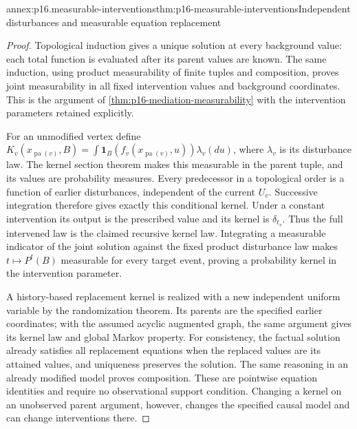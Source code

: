 \begin{annexitem}{annex:p16.measurable-interventions}{thm:p16-measurable-interventions}{Independent disturbances and measurable equation replacement}
\begin{proof}
Topological induction gives a unique solution at every background
value: each total function is evaluated after its parent values are
known. The same induction, using product measurability of finite
tuples and composition, proves joint measurability in all fixed
intervention values and background coordinates. This is the argument
of \cref{thm:p16-mediation-measurability} with the intervention
parameters retained explicitly.

For an unmodified vertex define
\(K_v(x_{\operatorname{pa}(v)},B)=
\int\mathbf1_B(f_v(x_{\operatorname{pa}(v)},u))\lambda_v(du)\),
where \(\lambda_v\) is its disturbance law. The kernel section
theorem makes this measurable in the parent tuple, and its values
are probability measures. Every predecessor in a topological order
is a function of earlier disturbances, independent of the current
\(U_v\). Successive integration therefore gives exactly this
conditional kernel. Under a constant intervention its output is
the prescribed value and its kernel is \(\delta_{t_v}\). Thus
the full intervened law is the claimed recursive kernel law.
Integrating a measurable indicator of the joint solution against
the fixed product disturbance law makes \(t\mapsto P^t(B)\)
measurable for every target event, proving a probability kernel in
the intervention parameter.

A history-based replacement kernel is realized with a new independent
uniform variable by the randomization theorem. Its parents are the
specified earlier coordinates; with the assumed acyclic augmented
graph, the same argument gives its kernel law and global Markov
property. For consistency, the factual solution already satisfies
all replacement equations when the replaced values are its attained
values, and uniqueness preserves the solution. The same reasoning
in an already modified model proves composition. These are pointwise
equation identities and require no observational support condition.
Changing a kernel on an unobserved parent argument, however, changes
the specified causal model and can change interventions there.
\end{proof}
\end{annexitem}

